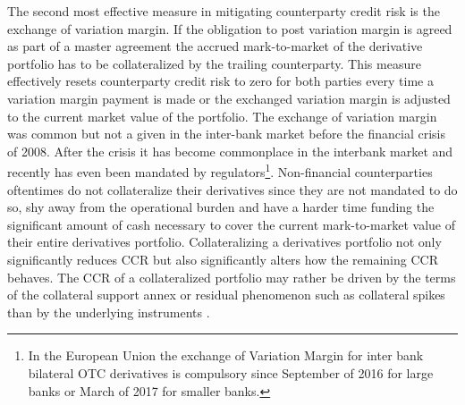 \documentclass[../Thesis_AHoecherl.tex]{subfiles}
\begin{document}
The second most effective measure in mitigating counterparty credit risk is the exchange of variation margin. If the obligation to post variation margin is agreed as part of a master agreement the accrued mark-to-market of the derivative portfolio has to be collateralized by the trailing counterparty. This measure effectively resets counterparty credit risk to zero for both parties every time a variation margin payment is made or the exchanged variation margin is adjusted to the current market value of the portfolio. The exchange of variation margin was common but not a given in the inter-bank market before the financial crisis of 2008. After the crisis it has become commonplace in the interbank market and recently has even been mandated by regulators\footnote{In the European Union the exchange of Variation Margin for inter bank bilateral \gls{OTC} derivatives is compulsory since September of 2016 for large banks or March of 2017 for smaller banks.}. Non-financial counterparties oftentimes do not collateralize their derivatives since they are not mandated to do so, shy away from the operational burden and have a harder time funding the significant amount of cash necessary to cover the current mark-to-market value of their entire derivatives portfolio. Collateralizing a derivatives portfolio not only significantly reduces \gls{CCR} but also significantly alters how the remaining \gls{CCR} behaves. The \gls{CCR} of a collateralized portfolio may rather be driven by the terms of the collateral support annex or residual phenomenon such as collateral spikes than by the underlying instruments \cite{andersen2017does}. 
\end{document}
